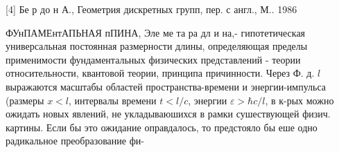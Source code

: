\documentclass[10pt]{article}
\begin{document}
[4] Бе р до н А., Геометрия дискретных групп, пер. с англ., М.. 1986



ФУнПАМЕнтАПЬНАЯ пПИНА, Эле ме та ра дл и на,- гипотетическая универсальная постоянная размерности длины, определяющая пределы применимости фундаментальных физических представлений - теории относительности, квантовой теории, принципа причинности. Через Ф. д. $l$ выражаются масштабы областей пространства-времени и энергии-импульса (размеры $x<l$, интервалы времени $t<l / c$, энергии $\varepsilon>\hbar c / l$, в к-рых можно ожидать новых явлений, не укладываюшихся в рамки сушествующей физич. картины. Если бы это ожидание оправдалось, то предстояло бы еше одно радикальное преобразование фи-
\end{document}
